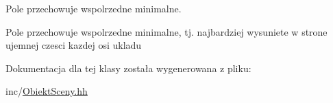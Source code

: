 Pole przechowuje wspolrzedne minimalne. 

Pole przechowuje wspolrzedne minimalne, tj. najbardziej wysuniete w strone ujemnej czesci kazdej osi ukladu 

Dokumentacja dla tej klasy została wygenerowana z pliku\+:\begin{DoxyCompactItemize}
\item 
inc/\hyperlink{ObiektSceny_8hh}{Obiekt\+Sceny.\+hh}\end{DoxyCompactItemize}
